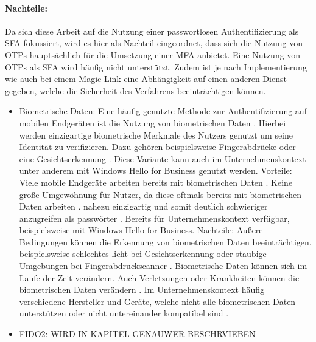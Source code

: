 \paragraph*{Nachteile:} Da sich diese Arbeit auf die Nutzung einer passwortlosen Authentifizierung als \ac{SFA} fokussiert, wird es hier als Nachteil eingeordnet, dass sich die Nutzung von \ac{OTP}s hauptsächlich für die Umsetzung einer \ac{MFA} anbietet. Eine Nutzung von \ac{OTP}s als \ac{SFA} wird häufig nicht unterstützt. Zudem ist je nach Implementierung wie auch bei einem Magic Link eine Abhängigkeit auf einen anderen Dienst gegeben, welche die Sicherheit des Verfahrens beeinträchtigen können.

\begin{itemize}
    
    \item Biometrische Daten:
    Eine häufig genutzte Methode zur Authentifizierung auf mobilen Endgeräten ist die Nutzung von biometrischen Daten \cite{parmar2022comprehensive}. 
    Hierbei werden einzigartige biometrische Merkmale des Nutzers genutzt um seine Identität zu verifizieren. Dazu gehören beispielsweise Fingerabdrücke oder eine Gesichtserkennung \cite{parmar2022comprehensive}. Diese Variante kann auch im Unternehmenskontext unter anderem mit Windows Hello for Business genutzt werden.
    Vorteile:
    Viele mobile Endgeräte arbeiten bereits mit biometrischen Daten \cite{parmar2022comprehensive}.
    Keine große Umgewöhnung für Nutzer, da diese oftmals bereits mit biometrischen Daten arbeiten \cite{parmar2022comprehensive}.
    nahezu einzigartig und somit deutlich schwieriger anzugreifen als passwörter \cite{parmar2022comprehensive}.
    Bereits für Unternehmenskontext verfügbar, beispielsweise mit Windows Hello for Business.
    Nachteile:
    Äußere Bedingungen können die Erkennung von biometrischen Daten beeinträchtigen. beispielsweise schlechtes licht bei Gesichtserkennung oder staubige Umgebungen bei Fingerabdruckscanner \cite{parmar2022comprehensive}.
    Biometrische Daten können sich im Laufe der Zeit verändern. Auch Verletzungen oder Krankheiten können die biometrischen Daten verändern \cite{boonkrong2012security}.
    Im Unternehmenskontext häufig verschiedene Hersteller und Geräte, welche nicht alle biometrischen Daten unterstützen oder nicht untereinander kompatibel sind \cite{parmar2022comprehensive}.

    \item FIDO2:
    WIRD IN KAPITEL GENAUWER BESCHRVIEBEN


\end{itemize}


